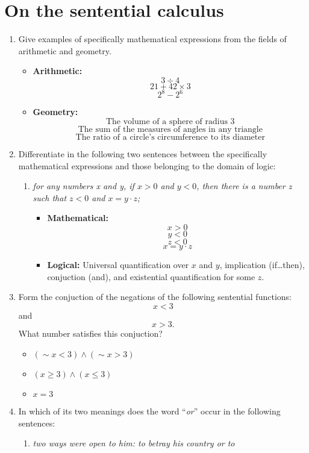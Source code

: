 \section{On the sentential calculus}
\begin{enumerate}
\item Give examples of specifically mathematical expressions from the
  fields of arithmetic and geometry.
  \begin{itemize}
  \item \textbf{Arithmetic:}
    $$3 \div 4$$
    $$21 + 42 \times 3$$
    $$2^8 - 2^6$$
  \item \textbf{Geometry:}
    $$\text{The volume of a sphere of radius 3}$$
    $$\text{The sum of the measures of angles in any triangle}$$
    $$\text{The ratio of a circle's circumference to its diameter}$$
  \end{itemize}
\item Differentiate in the following two sentences between the
  specifically mathematical expressions and those belonging to the
  domain of logic:
  \begin{enumerate}
    \item \emph{for any numbers x and y, if $x>0$ and $y<0$, then
      there is a number z such that $z<0$ and $x=y \cdot z$;}
      \begin{itemize}
      \item \textbf{Mathematical:} $$x>0$$ $$y<0$$ $$z<0$$ $$x=y \cdot
        z$$
      \item \textbf{Logical:} Universal quantification over $x$ and
        $y$, implication (if{\ldots}then), conjuction (and), and
        existential quantification for some $z$.
      \end{itemize}
  \end{enumerate}
\item Form the conjuction of the negations of the following sentential
  functions:
  $$x<3$$
  and
  $$x>3.$$
  What number satisfies this conjuction?
  \begin{itemize}
  \item $(\sim x<3) \wedge (\sim x>3)$
  \item $(x \ge 3) \wedge (x \le 3)$
  \item $x = 3$
  \end{itemize}
\item In which of its two meanings does the word ``\emph{or}'' occur in the
  following sentences:
  \begin{enumerate}
  \item \emph{two ways were open to him: to betray his country or to
}
\end{enumerate}
\end{enumerate}
